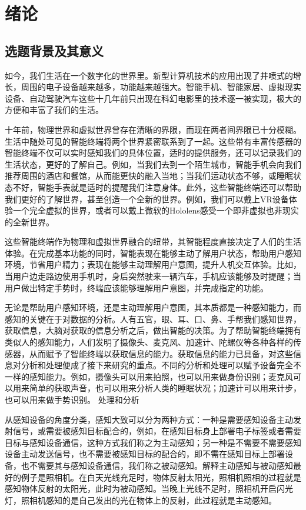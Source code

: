 \chapter{绪论}

\section{选题背景及其意义}
如今，我们生活在一个数字化的世界里。新型计算机技术的应用出现了井喷式的增长，周围的电子设备越来越多，功能越来越强大。智能手机、智能家居、虚拟现实设备、自动驾驶汽车这些十几年前只出现在科幻电影里的技术逐一被实现，极大的方便和丰富了我们的生活。

十年前，物理世界和虚拟世界曾存在清晰的界限，而现在两者间界限已十分模糊。生活中随处可见的智能终端将两个世界紧密联系到了一起。这些带有丰富传感器的智能终端不仅可以实时感知我们的具体位置，适时的提供服务，还可以记录我们的生活状态，更好的了解自己。例如，当我们去到一个陌生城市，智能手机会向我们推荐周围的酒店和餐馆，从而能更快的融入当地；当我们运动状态不够，或睡眠状态不好，智能手表就是适时的提醒我们注意身体。此外，这些智能终端还可以帮助我们更好的了解世界，甚至创造一个全新的世界。例如，我们可以戴上VR设备体验一个完全虚拟的世界，或者可以戴上微软的Hololens感受一个即非虚拟也非现实的全新世界。 

这些智能终端作为物理和虚拟世界融合的纽带，其智能程度直接决定了人们的生活体验。在完成基本功能的同时，智能表现在能够主动了解用户状态，帮助用户感知环境，节省用户精力；表现在能够主动理解用户意图，提升人机交互体验。比如，当用户边走路边使用手机时，身后突然驶来一辆汽车，手机应该能够及时提醒；当用户做出特定手势时，终端应该能够理解用户意图，并完成指定的功能。

无论是帮助用户感知环境，还是主动理解用户意图，其本质都是一种感知能力，而感知的关键在于对数据的分析。人有五官，眼、耳、口、鼻、手帮我们感知世界，获取信息，大脑对获取的信息分析之后，做出智能的决策。为了帮助智能终端拥有类似人的感知能力，人们发明了摄像头、麦克风、加速计、陀螺仪等各种各样的传感器，从而赋予了智能终端以获取信息的能力。获取信息的能力已具备，对这些信息对分析和处理便成了接下来研究的重点。不同的分析和处理可以赋予设备完全不一样的感知能力。例如，摄像头可以用来拍照，也可以用来做身份识别；麦克风可以用来简单的获取声音，也可以用来分析人类的睡眠状况；加速计可以用来计步，也可以用来做手势识别。
处理和分析

从感知设备的角度分类，感知大致可以分为两种方式：一种是需要感知设备主动发射信号，或需要被感知目标配合的，例如，在感知目标身上部署电子标签或者需要目标与感知设备通信，这种方式我们称之为主动感知；另一种是不需要不需要感知设备主动发送信号，也不需要被感知目标的配合的，即不需在感知目标上部署设备，也不需要其与感知设备通信，我们称之被动感知。解释主动感知与被动感知最好的例子是照相机。在白天光线充足时，物体反射太阳光，照相机照相的过程就是感知物体反射的太阳光，此时为被动感知。当晚上光线不足时，照相机开启闪光灯，照相机感知的是自己发出的光在物体上的反射，此过程就是主动感知。

